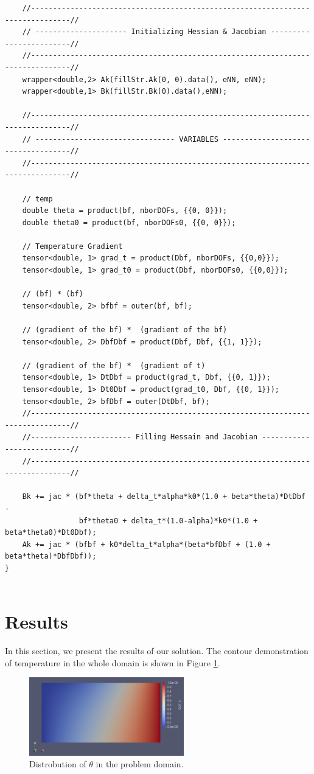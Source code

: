 \documentclass[]{article}
\begin{document}
\begin{lstlisting}
	//-------------------------------------------------------------------------------//
	// --------------------- Initializing Hessian & Jacobian ------------------------//
	//-------------------------------------------------------------------------------//
	wrapper<double,2> Ak(fillStr.Ak(0, 0).data(), eNN, eNN);
	wrapper<double,1> Bk(fillStr.Bk(0).data(),eNN);
	
	//-------------------------------------------------------------------------------//
	// -------------------------------- VARIABLES -----------------------------------//
	//-------------------------------------------------------------------------------//
	
	// temp
	double theta = product(bf, nborDOFs, {{0, 0}});
	double theta0 = product(bf, nborDOFs0, {{0, 0}});
	
	// Temperature Gradient
	tensor<double, 1> grad_t = product(Dbf, nborDOFs, {{0,0}});
	tensor<double, 1> grad_t0 = product(Dbf, nborDOFs0, {{0,0}});
	
	// (bf) * (bf)
	tensor<double, 2> bfbf = outer(bf, bf);
	
	// (gradient of the bf) *  (gradient of the bf)
	tensor<double, 2> DbfDbf = product(Dbf, Dbf, {{1, 1}});
	
	// (gradient of the bf) *  (gradient of t)
	tensor<double, 1> DtDbf = product(grad_t, Dbf, {{0, 1}});
	tensor<double, 1> Dt0Dbf = product(grad_t0, Dbf, {{0, 1}});
	tensor<double, 2> bfDbf = outer(DtDbf, bf);
	//-------------------------------------------------------------------------------//
	//----------------------- Filling Hessain and Jacobian --------------------------//
	//-------------------------------------------------------------------------------// 
	
	Bk += jac * (bf*theta + delta_t*alpha*k0*(1.0 + beta*theta)*DtDbf -
	             bf*theta0 + delta_t*(1.0-alpha)*k0*(1.0 + beta*theta0)*Dt0Dbf);
	Ak += jac * (bfbf + k0*delta_t*alpha*(beta*bfDbf + (1.0 + beta*theta)*DbfDbf));
}


\end{lstlisting}

\section{Results} \label{sec: rst}
In this section, we present the results of our solution. The contour demonstration of temperature in the whole domain is shown in Figure \ref{fig_Rs2}.
\begin{figure}[htbp]
	\centering
	\includegraphics[width=0.6\textwidth]{Figures/result.png}
	\caption{Distrobution of $\theta$ in the problem domain.}
	\label{fig_Rs2}
\end{figure}

 
\end{document}
